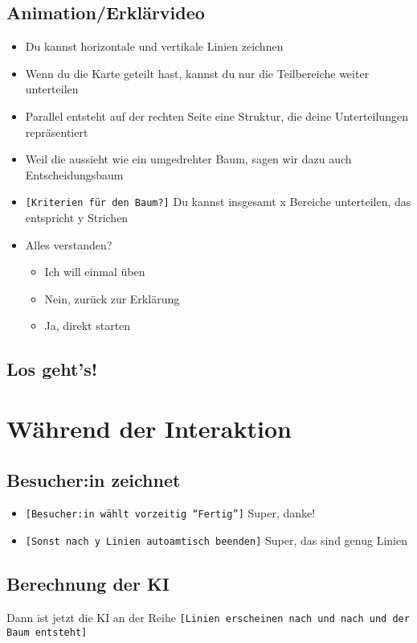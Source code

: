 \documentclass[12pt]{article}
\begin{document}
\subsection{Animation/Erklärvideo}
\begin{itemize}
    \item Du kannst horizontale und vertikale Linien zeichnen 
    \item Wenn du die Karte geteilt hast, kannst du nur die Teilbereiche weiter unterteilen
    \item Parallel entsteht auf der rechten Seite eine Struktur, die deine Unterteilungen repräsentiert 
    \item Weil die aussieht wie ein umgedrehter Baum, sagen wir dazu auch Entscheidungsbaum
    \item \texttt{[Kriterien für den Baum?]} Du kannst insgesamt x Bereiche unterteilen, das entspricht y Strichen
    \item Alles verstanden?
    \begin{itemize}
        \item Ich will einmal üben
        \item Nein, zurück zur Erklärung
        \item Ja, direkt starten
    \end{itemize}
\end{itemize}

\subsection{Los geht's!}

\section{Während der Interaktion}
\subsection{Besucher:in zeichnet}
\begin{itemize}
    \item \texttt{[Besucher:in wählt vorzeitig ``Fertig'']} Super, danke!
    \item \texttt{[Sonst nach y Linien autoamtisch beenden]} Super, das sind genug Linien
\end{itemize}

\subsection{Berechnung der KI}
Dann ist jetzt die KI an der Reihe \texttt{[Linien erscheinen nach und nach und der Baum entsteht]}
\end{document}
